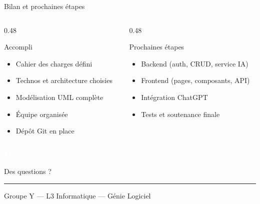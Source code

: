 \documentclass[aspectratio=169, 10pt]{beamer}
\begin{document}
\begin{frame}{Bilan et prochaines étapes}
\begin{columns}[T]
\begin{column}{0.48\textwidth}
\begin{exampleblock}{Accompli}
\small
\begin{itemize}
    \item Cahier des charges défini
    \item Technos et architecture choisies
    \item Modélisation UML complète
    \item Équipe organisée
    \item Dépôt Git en place
\end{itemize}
\end{exampleblock}
\end{column}
\begin{column}{0.48\textwidth}
\begin{block}{Prochaines étapes}
\small
\begin{itemize}
    \item Backend (auth, CRUD, service IA)
    \item Frontend (pages, composants, API)
    \item Intégration ChatGPT
    \item Tests et soutenance finale
\end{itemize}
\end{block}
\end{column}
\end{columns}
\end{frame}

{
\begin{frame}[plain]
\vfill
\begin{center}
{\Huge\bfseries\textcolor{white}{Merci !}}\par
\vspace{0.5cm}
{\large\textcolor{accent!70!white}{Des questions ?}}\par
\vspace{0.7cm}
\textcolor{muted}{\rule{3cm}{0.3pt}}\par
\vspace{0.3cm}
{\footnotesize\textcolor{muted}{Groupe Y — L3 Informatique — Génie Logiciel}}
\end{center}
\vfill
\end{frame}
}
\end{document}
